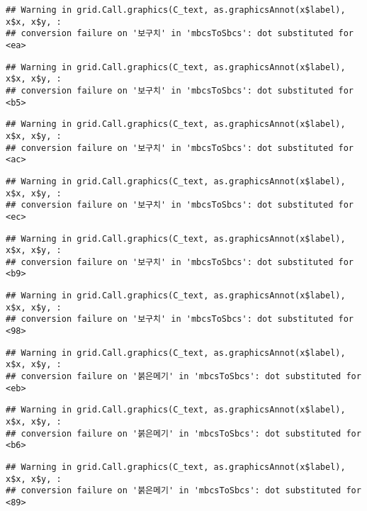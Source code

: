 \documentclass[
]{article}
\begin{document}
\begin{verbatim}
## Warning in grid.Call.graphics(C_text, as.graphicsAnnot(x$label), x$x, x$y, :
## conversion failure on '보구치' in 'mbcsToSbcs': dot substituted for <ea>
\end{verbatim}

\begin{verbatim}
## Warning in grid.Call.graphics(C_text, as.graphicsAnnot(x$label), x$x, x$y, :
## conversion failure on '보구치' in 'mbcsToSbcs': dot substituted for <b5>
\end{verbatim}

\begin{verbatim}
## Warning in grid.Call.graphics(C_text, as.graphicsAnnot(x$label), x$x, x$y, :
## conversion failure on '보구치' in 'mbcsToSbcs': dot substituted for <ac>
\end{verbatim}

\begin{verbatim}
## Warning in grid.Call.graphics(C_text, as.graphicsAnnot(x$label), x$x, x$y, :
## conversion failure on '보구치' in 'mbcsToSbcs': dot substituted for <ec>
\end{verbatim}

\begin{verbatim}
## Warning in grid.Call.graphics(C_text, as.graphicsAnnot(x$label), x$x, x$y, :
## conversion failure on '보구치' in 'mbcsToSbcs': dot substituted for <b9>
\end{verbatim}

\begin{verbatim}
## Warning in grid.Call.graphics(C_text, as.graphicsAnnot(x$label), x$x, x$y, :
## conversion failure on '보구치' in 'mbcsToSbcs': dot substituted for <98>
\end{verbatim}

\begin{verbatim}
## Warning in grid.Call.graphics(C_text, as.graphicsAnnot(x$label), x$x, x$y, :
## conversion failure on '붉은메기' in 'mbcsToSbcs': dot substituted for <eb>
\end{verbatim}

\begin{verbatim}
## Warning in grid.Call.graphics(C_text, as.graphicsAnnot(x$label), x$x, x$y, :
## conversion failure on '붉은메기' in 'mbcsToSbcs': dot substituted for <b6>
\end{verbatim}

\begin{verbatim}
## Warning in grid.Call.graphics(C_text, as.graphicsAnnot(x$label), x$x, x$y, :
## conversion failure on '붉은메기' in 'mbcsToSbcs': dot substituted for <89>
\end{verbatim}
\end{document}
